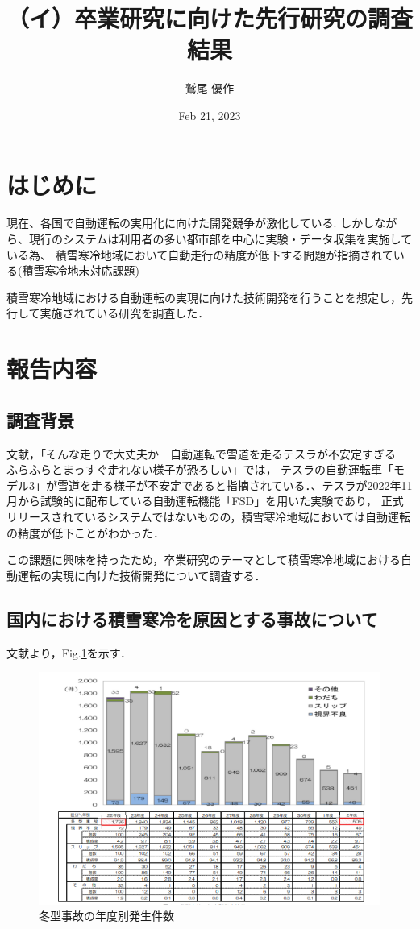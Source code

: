 \documentclass[a4paper]{jarticle}
\title{（イ）卒業研究に向けた先行研究の調査結果}
\author{鷲尾 優作}
\date{Feb 21, 2023}
\begin{document}
\maketitle
%
\section{はじめに}
%
現在、各国で自動運転の実用化に向けた開発競争が激化している.
しかしながら、現行のシステムは利用者の多い都市部を中心に実験・データ収集を実施している為、
積雪寒冷地域において自動走行の精度が低下する問題が指摘されている(積雪寒冷地未対応課題)

積雪寒冷地域における自動運転の実現に向けた技術開発を行うことを想定し，先行して実施されている研究を調査した．
%
\section{報告内容}
%
\subsection{調査背景}
文献\cite{yahoo-sonnahashiri:online}，「そんな走りで大丈夫か　自動運転で雪道を走るテスラが不安定すぎる　ふらふらとまっすぐ走れない様子が恐ろしい」では，
テスラの自動運転車「モデル3」が雪道を走る様子が不安定であると指摘されている．、テスラが2022年11月から試験的に配布している自動運転機能「FSD」を用いた実験であり，
正式リリースされているシステムではないものの，積雪寒冷地域においては自動運転の精度が低下ことがわかった．

この課題に興味を持ったため，卒業研究のテーマとして積雪寒冷地域における自動運転の実現に向けた技術開発について調査する．

\subsection{国内における積雪寒冷を原因とする事故について}
文献\cite{blizzard52:online}より，Fig.\ref{21}を示す．

\begin{figure}[H]
  \centering
  \includegraphics[width=0.4\linewidth]{picture/21.png}
  \caption{冬型事故の年度別発生件数}
  \label{21}
\end{figure}
\end{document}
